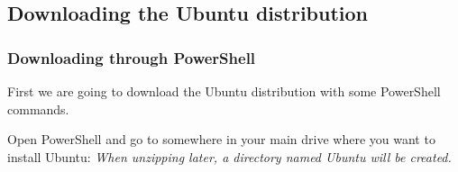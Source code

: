\subsection{Downloading the Ubuntu distribution}

\subsubsection{Downloading through PowerShell}

First we are going to download the Ubuntu distribution with some PowerShell commands.

Open PowerShell and go to somewhere in your main drive where you want to install Ubuntu:
\textit{When unzipping later, a directory named Ubuntu will be created.}

